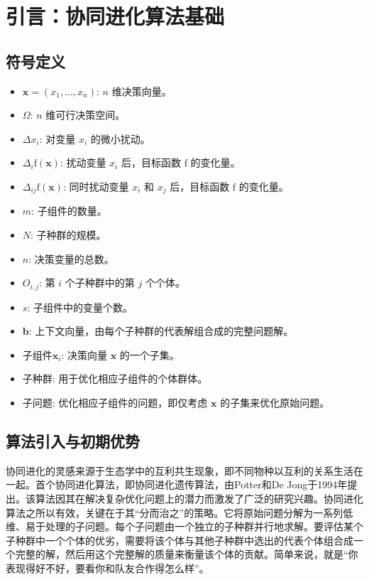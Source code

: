 \section{引言：协同进化算法基础}

\subsection{符号定义}
\begin{itemize}
\item $\mathbf{x} = (x_1, \dots, x_n)$: $n$ 维决策向量。
\item $\Omega$: $n$ 维可行决策空间。
\item $\Delta x_i$: 对变量 $x_i$ 的微小扰动。
\item $\Delta_i \mathrm{f}(\mathbf{x})$: 扰动变量 $x_i$ 后，目标函数 $\mathrm{f}$ 的变化量。
\item $\Delta_{ij} \mathrm{f}(\mathbf{x})$: 同时扰动变量 $x_i$ 和 $x_j$ 后，目标函数 $\mathrm{f}$ 的变化量。
\item $m$: 子组件的数量。
\item $N$: 子种群的规模。
\item $n$: 决策变量的总数。
\item $O_{i,j}$: 第 $i$ 个子种群中的第 $j$ 个个体。
\item $s$: 子组件中的变量个数。
\item $\mathbf{b}$: 上下文向量，由每个子种群的代表解组合成的完整问题解。
\item 子组件$\mathbf{x}_i$: 决策向量 $\mathbf{x}$ 的一个子集。
\item 子种群: 用于优化相应子组件的个体群体。
\item 子问题: 优化相应子组件的问题，即仅考虑 $\mathbf{x}$ 的子集来优化原始问题。
\end{itemize}

\subsection{算法引入与初期优势}
协同进化的灵感来源于生态学中的互利共生现象，即不同物种以互利的关系生活在一起。首个协同进化算法，即协同进化遗传算法，由Potter和De Jong于1994年提出。该算法因其在解决复杂优化问题上的潜力而激发了广泛的研究兴趣。协同进化算法之所以有效，关键在于其“分而治之”的策略。它将原始问题分解为一系列低维、易于处理的子问题。每个子问题由一个独立的子种群并行地求解。要评估某个子种群中一个个体的优劣，需要将该个体与其他子种群中选出的代表个体组合成一个完整的解，然后用这个完整解的质量来衡量该个体的贡献。简单来说，就是“你表现得好不好，要看你和队友合作得怎么样”。

